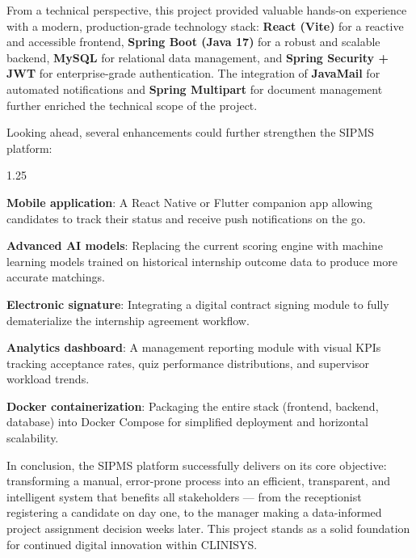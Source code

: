 \par
From a technical perspective, this project provided valuable hands-on experience with a modern, production-grade technology stack: \textbf{React (Vite)} for a reactive and accessible frontend, \textbf{Spring Boot (Java 17)} for a robust and scalable backend, \textbf{MySQL} for relational data management, and \textbf{Spring Security + JWT} for enterprise-grade authentication. The integration of \textbf{JavaMail} for automated notifications and \textbf{Spring Multipart} for document management further enriched the technical scope of the project.

\par
Looking ahead, several enhancements could further strengthen the SIPMS platform:
\begin{itemize}[leftmargin=2cm, topsep=4pt]
    \begin{spacing}{1.25}
        \item \textbf{Mobile application}: A React Native or Flutter companion app allowing candidates to track their status and receive push notifications on the go.
        \item \textbf{Advanced AI models}: Replacing the current scoring engine with machine learning models trained on historical internship outcome data to produce more accurate matchings.
        \item \textbf{Electronic signature}: Integrating a digital contract signing module to fully dematerialize the internship agreement workflow.
        \item \textbf{Analytics dashboard}: A management reporting module with visual KPIs tracking acceptance rates, quiz performance distributions, and supervisor workload trends.
        \item \textbf{Docker containerization}: Packaging the entire stack (frontend, backend, database) into Docker Compose for simplified deployment and horizontal scalability.
    \end{spacing}
\end{itemize}

\par
In conclusion, the SIPMS platform successfully delivers on its core objective: transforming a manual, error-prone process into an efficient, transparent, and intelligent system that benefits all stakeholders — from the receptionist registering a candidate on day one, to the manager making a data-informed project assignment decision weeks later. This project stands as a solid foundation for continued digital innovation within CLINISYS.
